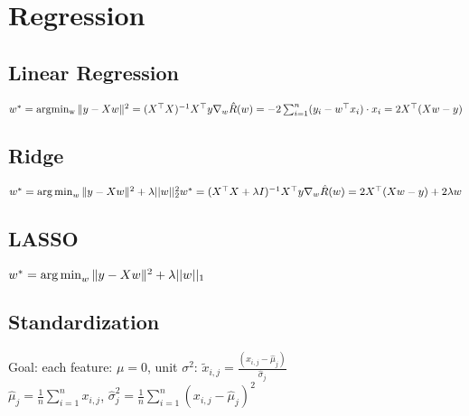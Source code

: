 \section*{Regression}
\subsection*{Linear Regression}
$w^* = \operatorname{argmin_w} \|y - Xw\|^2=(X^\top X)^{-1} X^\top y\\
\nabla_w \hat{R}(w) = -2 \sum_{i=1}^n (y_i-w^\top x_i) \cdot x_i\\
= 2X^\top (Xw-y)$


\subsection*{Ridge}
$w^*=\operatorname*{arg\,min}_w \|y - Xw\|^2 + \lambda ||w||_2^2\\
w^*=(X^\top X + \lambda I)^{-1} X^\top y\\
\nabla_w \hat{R}(w) = 2X^\top (Xw-y) + 2\lambda w$

\subsection*{LASSO}
$w^*=\operatorname*{arg\,min}_w \|y - Xw\|^2 + \lambda ||w||_1$
\\

\subsection*{Standardization}
Goal: each feature: $\mu = 0$, unit $\sigma^2$: $\tilde{x}_{i,j} = \frac{(x_{i,j}-\hat{\mu}_j)}{\hat{\sigma}_j}$\\
$\hat{\mu}_j = \frac{1}{n}\sum_{i=1}^n x_{i,j}$, $\hat{\sigma}_j^2 = \frac{1}{n}\sum_{i=1}^n {(x_{i,j}-\hat{\mu}_j)}^2$ 
